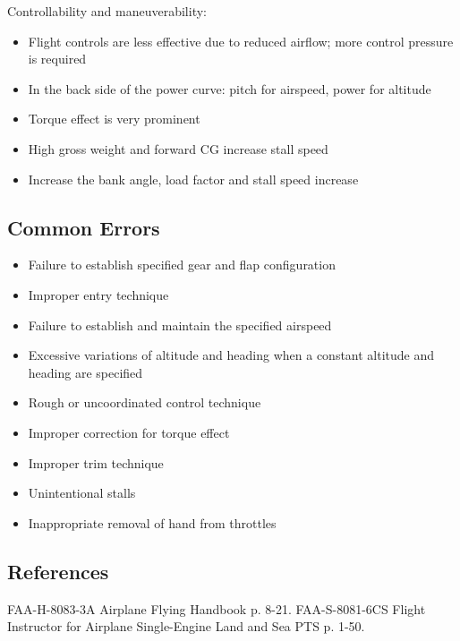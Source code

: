 Controllability and maneuverability:
\begin{itemize}
  \item Flight controls are less effective due to reduced airflow; more control
    pressure is required
  \item In the back side of the power curve: pitch for airspeed, power for
    altitude
  \item Torque effect is very prominent
  \item High gross weight and forward CG increase stall speed
  \item Increase the bank angle, load factor and stall speed increase
\end{itemize}

\subsection{Common Errors}

\begin{itemize}
  \item Failure to establish specified gear and flap configuration
  \item Improper entry technique
  \item Failure to establish and maintain the specified airspeed
  \item Excessive variations of altitude and heading when a constant altitude
    and heading are specified
  \item Rough or uncoordinated control technique
  \item Improper correction for torque effect
  \item Improper trim technique
  \item Unintentional stalls
  \item Inappropriate removal of hand from throttles
\end{itemize}

\subsection{References}

FAA-H-8083-3A Airplane Flying Handbook p. 8-21.
FAA-S-8081-6CS Flight Instructor for Airplane Single-Engine Land and Sea PTS p.
1-50.

